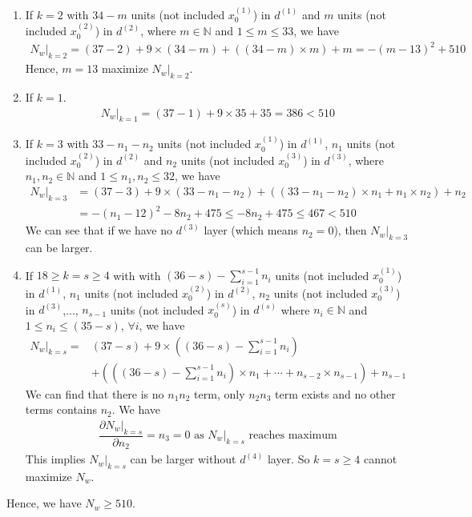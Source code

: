 \documentclass[12pt]{article}
\newcommand{\ParTh}[1]{\left(#1\right)}
\begin{document}
\begin{enumerate}
	\item If $k=2$ with $34-m$ units (not included $x^{\ParTh{1}}_0$) in $d^{\ParTh{1}}$ and $m$ units (not included $x^{\ParTh{2}}_0$) in $d^{\ParTh{2}}$, where $m\in\mathbb{N}$ and $1\leq m\leq33$, we have
	\begin{align}
	\left.N_w\right|_{k=2}=\ParTh{37-2}+9\times\ParTh{34-m}+\ParTh{\ParTh{34-m}\times m}+m=-\ParTh{m-13}^2+510
	\end{align}
	Hence, $m=13$ maximize $\left.N_w\right|_{k=2}$.
	\item If $k=1$.
	\begin{align}
	\left.N_w\right|_{k=1}=\ParTh{37-1}+9\times35+35=386<510
	\end{align}
	\item If $k=3$ with $33-n_1-n_2$ units (not included $x^{\ParTh{1}}_0$) in $d^{\ParTh{1}}$, $n_1$ units (not included $x^{\ParTh{2}}_0$) in $d^{\ParTh{2}}$ and $n_2$ units (not included $x^{\ParTh{3}}_0$) in $d^{\ParTh{3}}$, where $n_1,n_2\in\mathbb{N}$ and $1\leq n_1,n_2\leq32$, we have
	\begin{align}
	\left.N_w\right|_{k=3}&=\ParTh{37-3}+9\times\ParTh{33-n_1-n_2}+\ParTh{\ParTh{33-n_1-n_2}\times n_1+n_1\times n_2}+n_2\\
	&=-\ParTh{n_1-12}^2-8n_2+475\leq-8n_2+475\leq467<510
	\end{align}
	We can see that if we have no $d^{\ParTh{3}}$ layer (which means $n_2=0$), then $\left.N_w\right|_{k=3}$ can be larger.
	\item If $18\geq k=s\geq4$ with with $\ParTh{36-s}-\sum_{i=1}^{s-1}n_i$ units (not included $x^{\ParTh{1}}_0$) in $d^{\ParTh{1}}$, $n_1$ units (not included $x^{\ParTh{2}}_0$) in $d^{\ParTh{2}}$, $n_2$ units (not included $x^{\ParTh{3}}_0$) in $d^{\ParTh{3}}$,..., $n_{s-1}$ units (not included $x^{\ParTh{s}}_0$) in $d^{\ParTh{s}}$ where $n_i\in\mathbb{N}$ and $1\leq n_i\leq\ParTh{35-s}$, $\forall i$, we have
	\begin{align}
	\nonumber
	\left.N_w\right|_{k=s}=&\ParTh{37-s}+9\times\ParTh{\ParTh{36-s}-\sum_{i=1}^{s-1}n_i}\\
	&+\ParTh{\ParTh{\ParTh{36-s}-\sum_{i=1}^{s-1}n_i}\times n_1+\cdots+n_{s-2}\times n_{s-1}}+n_{s-1}
	\end{align}
	We can find that there is no $n_1n_2$ term, only $n_2n_3$ term exists and no other terms contains $n_2$. We have
	\begin{align}
	\dfrac{\partial\left.N_w\right|_{k=s}}{\partial n_2}=n_3=0\text{ as }\left.N_w\right|_{k=s}\text{ reaches maximum}
	\end{align}
	This implies $\left.N_w\right|_{k=s}$ can be larger without $d^{\ParTh{4}}$ layer. So $k=s\geq4$ cannot maximize $N_w$.
\end{enumerate}
Hence, we have $N_w\geq510$.
\end{document}
